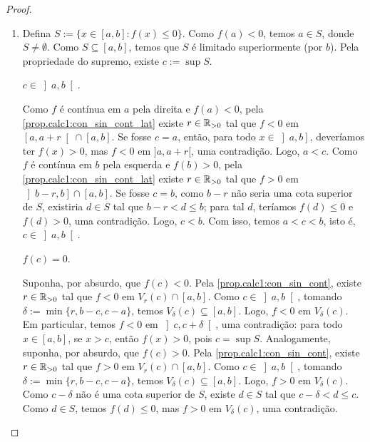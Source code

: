 \begin{proof} 
    \begin{enumerate}[leftmargin=*, align=left, label=\textbf{(\alph*)}]
        \item Defina $S := \{x \in [a,b] : f(x) \leq 0\}$. Como $f(a) < 0$, temos $a \in S$, donde $S \neq \emptyset$. Como $S \subseteq [a,b]$, temos que $S$ é limitado superiormente (por $b$). Pela propriedade do supremo, existe $c := \sup S$. 
            \begin{claim}
                $c \in \left]a,b \right[$.
            \end{claim}
            \begin{midproof}
                Como $f$ é contínua em $a$ pela direita e $f(a) < 0$, pela \cref{prop.calc1:con_sin_cont_lat} existe $r \in \mathbb{R}_{>0}$ tal que $f < 0$ em $\left[a, a+r \right[ \cap [a,b]$. Se fosse $c=a$, então, para todo $x \in \left]a,b \right]$, deveríamos ter $f(x) > 0$, mas $f < 0$ em $]a,a+r[$, uma contradição. Logo, $a < c$. Como $f$ é contínua em $b$ pela esquerda e $f(b) > 0$, pela \cref{prop.calc1:con_sin_cont_lat} existe $r \in \mathbb{R}_{>0}$ tal que $f > 0$ em $\left]b-r, b \right] \cap [a,b]$. Se fosse $c=b$, como $b-r$ não seria uma cota superior de $S$, existiria $d \in S$ tal que $b-r < d \leq b$; para tal $d$, teríamos $f(d) \leq 0$ e $f(d) > 0$, uma contradição. Logo, $c < b$. Com isso, temos $a<c<b$, isto é, $c \in \left] a,b \right[$. \whiteproof
            \end{midproof}
            \begin{claim}
                $f(c) = 0$.
            \end{claim}
            \begin{midproof}
                Suponha, por absurdo, que $f(c) < 0$. Pela \cref{prop.calc1:con_sin_cont}, existe $r \in \mathbb{R}_{>0}$ tal que $f < 0$ em $V_{r}(c) \cap [a,b]$. Como $c \in \left]a,b \right[$, tomando $\delta := \min \{r, b-c, c-a\}$, temos $V_{\delta}(c) \subseteq [a,b]$. Logo, $f<0$ em $V_{\delta}(c)$. Em particular, temos $f < 0$ em $\left]c, c+\delta \right[$, uma contradição: para todo $x \in [a,b]$, se $x > c$, então $f(x) > 0$, pois $c = \sup S$. Analogamente, suponha, por absurdo, que $f(c) > 0$. Pela \cref{prop.calc1:con_sin_cont}, existe $r \in \mathbb{R}_{>0}$ tal que $f > 0$ em $V_{r}(c) \cap [a,b]$. Como $c \in \left]a,b \right[$, tomando $\delta := \min \{r, b-c, c-a\}$, temos $V_{\delta}(c) \subseteq [a,b]$. Logo, $f>0$ em $V_{\delta}(c)$. Como $c - \delta$ não é uma cota superior de $S$, existe $d \in S$ tal que $c-\delta< d \leq c$. Como $d \in S$, temos $f(d) \leq 0$, mas $f > 0$ em $V_{\delta}(c)$, uma contradição. \whiteproof

\end{midproof}
\end{enumerate}
\end{proof}

